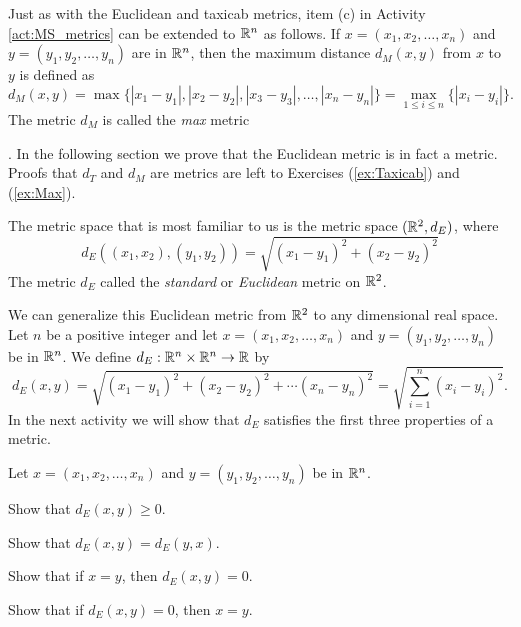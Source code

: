 Just as with the Euclidean and taxicab metrics, item (c) in Activity \ref{act:MS_metrics} can be extended to $\mathbb{R}^n$ as follows. If $x = (x_1, x_2, \ldots, x_n)$ and $y = (y_1, y_2, \ldots, y_n)$ are in $\mathbb{R}^n$, then the maximum distance $d_M(x,y)$ from $x$ to $y$ is defined as
\[d_M(x,y) = \max\{| x_1-y_1 |, | x_2-y_2 |, |x_3-y_3|, \ldots, |x_n-y_n| \} = \max_{1 \leq i \leq n} \{|x_i-y_i|\}.\]
The metric $d_M$ is called the \emph{max} metric{. In the following section we prove that the Euclidean metric is in fact a metric. Proofs that $d_T$ and $d_M$ are metrics are left to Exercises (\ref{ex:Taxicab}) and (\ref{ex:Max}). 

\label{sec_euclid_rn}
The metric space that is most familiar to us is the metric space $(\mathbb{R}^2, d_E)$, where 
\[d_E((x_1,x_2), (y_1,y_2)) = \sqrt{(x_1-y_1)^2 + (x_2-y_2)^2}\] 
The metric $d_E$ called the \emph{standard} or \emph{Euclidean} metric on $\mathbb{R}^2$. 

We can generalize this Euclidean metric from $\mathbb{R}^2$ to any dimensional real space. Let $n$ be a positive integer and let $x = (x_1, x_2, \ldots, x_n)$ and $y = (y_1, y_2, \ldots, y_n)$ be in $\mathbb{R}^n$. We define $d_E : \mathbb{R}^n \times \mathbb{R}^n \to \mathbb{R}$ by 
\[d_E(x,y) = \sqrt{(x_1-y_1)^2 + (x_2-y_2)^2 + \cdots (x_n-y_n)^2} = \sqrt{\sum_{i=1}^n (x_i-y_i)^2}.\]
In the next activity we will show that $d_E$ satisfies the first three properties of a metric.  

\begin{activity} Let $x = (x_1, x_2, \ldots, x_n)$ and $y = (y_1, y_2, \ldots, y_n)$ be in $\mathbb{R}^n$.
\ba
\item Show that $d_E(x,y) \geq 0$. 

\item Show that $d_E(x,y) = d_E(y,x)$.

\item Show that if $x=y$, then $d_E(x,y) = 0$.

\item Show that if $d_E(x,y) = 0$, then $x=y$. 

\ea

\end{activity}

\begin{comment}

\ActivitySolution

\ba
\item Since $(x_i-y_i)^2 \geq 0$ for each $i$, we have 
\[d_E(x,y) =  \sqrt{\sum_{i=1}^n (x_i-y_i)^2} \geq 0.\] 


\end{comment}}
